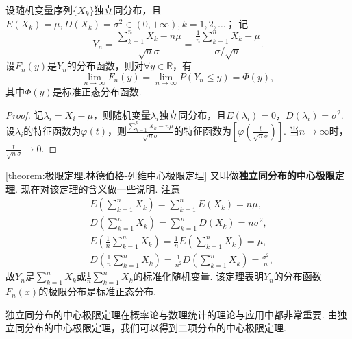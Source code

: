 \begin{theorem}\label{theorem:极限定理.林德伯格-列维中心极限定理}
设随机变量序列\(\{X_k\}\)独立同分布，且\(E(X_k)=\mu, D(X_k)=\sigma^2\in(0,+\infty), k=1,2,\dotsc\)；
记\[
Y_n = \frac{\sum\limits_{k=1}^n X_k - n\mu}{\sqrt{n} \sigma}
= \frac{ \frac{1}{n} \sum\limits_{k=1}^n X_k - \mu}{\sigma / \sqrt{n}}.
\]设\(F_n(y)\)是\(Y_n\)的分布函数，则对\(\forall y \in \mathbb{R}\)，有\[
\lim\limits_{n\to\infty} F_n(y)
= \lim\limits_{n\to\infty} P(Y_n \leqslant y) = \Phi(y),
\]其中\(\Phi(y)\)是标准正态分布函数.
\begin{proof}
记\(\lambda_i = X_i-\mu\)，则随机变量\(\lambda_i\)独立同分布，且\(E(\lambda_i)=0\)，\(D(\lambda_i)=\sigma^2\).
设\(\lambda_i\)的特征函数为\(\varphi(t)\)，则\(\frac{\sum\limits_{k=1}^n X_k - n\mu}{\sqrt{n} \sigma}\)的特征函数为\(\left[\varphi\left(\frac{t}{\sqrt{n}\sigma}\right)\right]\).
当\(n\to\infty\)时，\(\frac{t}{\sqrt{n}\sigma}\to0\).
\end{proof}
\end{theorem}

\cref{theorem:极限定理.林德伯格-列维中心极限定理} 又叫做\textbf{独立同分布的中心极限定理}.
现在对该定理的含义做一些说明.
注意\begin{align*}
&E\left(\sum\limits_{k=1}^n X_k\right) = \sum\limits_{k=1}^n E(X_k) = n\mu, \\
&D\left(\sum\limits_{k=1}^n X_k\right) = \sum\limits_{k=1}^n D(X_k) = n\sigma^2, \\
&E\left(\frac{1}{n} \sum\limits_{k=1}^n X_k\right)
= \frac{1}{n} E\left(\sum\limits_{k=1}^n X_k\right)
= \mu, \\
&D\left(\frac{1}{n} \sum\limits_{k=1}^n X_k\right)
= \frac{1}{n^2} D\left(\sum\limits_{k=1}^n X_k\right)
= \frac{\sigma^2}{n},
\end{align*}
故\(Y_n\)是\(\sum\limits_{k=1}^n X_k\)或\(\frac{1}{n} \sum\limits_{k=1}^n X_k\)的标准化随机变量.
该定理表明\(Y_n\)的分布函数\(F_n(x)\)的极限分布是标准正态分布.

独立同分布的中心极限定理在概率论与数理统计的理论与应用中都非常重要.
由独立同分布的中心极限定理，我们可以得到二项分布的中心极限定理.
